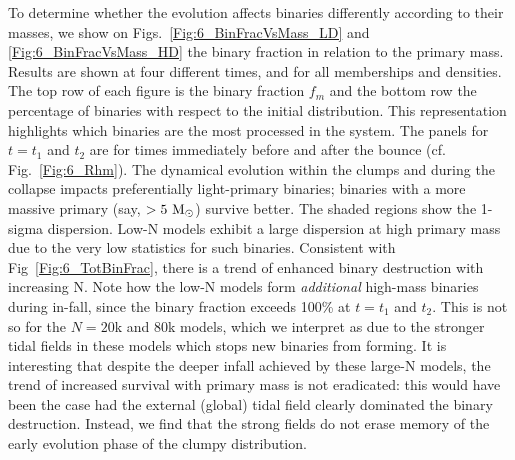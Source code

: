 To determine whether the evolution affects binaries differently according to their masses, we show on Figs.~\ref{Fig:6_BinFracVsMass_LD} and \ref{Fig:6_BinFracVsMass_HD} the binary fraction in relation to the primary mass. Results are shown at four different times, and for all memberships and densities. The top row of each figure is the binary fraction $f_m$ and the bottom row the percentage of binaries with respect to the initial distribution. 
This representation highlights which binaries are the most processed in the system. The panels for $t = t_1$ and $t_2$ are for times immediately before and after the bounce (cf. Fig.~\ref{Fig:6_Rhm}). The dynamical evolution within the clumps and during the collapse impacts preferentially light-primary binaries; binaries with a more massive primary (say, $> 5 ~{\textrm{M}_\odot}$) survive better. The shaded regions show
 the 1-sigma dispersion. Low-N models exhibit a large dispersion at high primary mass due to the very low statistics for such binaries. Consistent with Fig~\ref{Fig:6_TotBinFrac}, there is a trend of enhanced binary destruction with increasing N. Note how the low-N models form {\it additional} high-mass binaries during in-fall, since the binary fraction exceeds 100\% at $t = t_1 $ and $t_2$. This is not so for the $N = 20$k and $80$k models, which we interpret as due to the stronger tidal fields in these models which stops new binaries from forming. It is interesting that despite the deeper infall achieved by  these large-N models, the trend of increased survival with primary mass is not eradicated: this would have been the case had the external (global) tidal field clearly dominated the binary destruction. Instead, we find that the strong fields do not erase memory of the early evolution phase of the clumpy distribution. 



